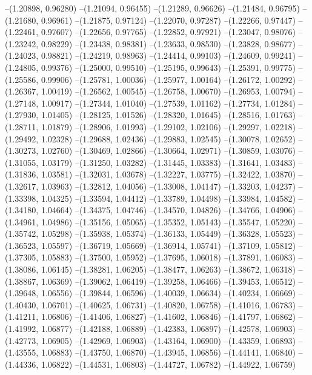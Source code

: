 --(1.20898, 0.96280)
--(1.21094, 0.96455)
--(1.21289, 0.96626)
--(1.21484, 0.96795)
--(1.21680, 0.96961)
--(1.21875, 0.97124)
--(1.22070, 0.97287)
--(1.22266, 0.97447)
--(1.22461, 0.97607)
--(1.22656, 0.97765)
--(1.22852, 0.97921)
--(1.23047, 0.98076)
--(1.23242, 0.98229)
--(1.23438, 0.98381)
--(1.23633, 0.98530)
--(1.23828, 0.98677)
--(1.24023, 0.98821)
--(1.24219, 0.98963)
--(1.24414, 0.99103)
--(1.24609, 0.99241)
--(1.24805, 0.99376)
--(1.25000, 0.99510)
--(1.25195, 0.99643)
--(1.25391, 0.99775)
--(1.25586, 0.99906)
--(1.25781, 1.00036)
--(1.25977, 1.00164)
--(1.26172, 1.00292)
--(1.26367, 1.00419)
--(1.26562, 1.00545)
--(1.26758, 1.00670)
--(1.26953, 1.00794)
--(1.27148, 1.00917)
--(1.27344, 1.01040)
--(1.27539, 1.01162)
--(1.27734, 1.01284)
--(1.27930, 1.01405)
--(1.28125, 1.01526)
--(1.28320, 1.01645)
--(1.28516, 1.01763)
--(1.28711, 1.01879)
--(1.28906, 1.01993)
--(1.29102, 1.02106)
--(1.29297, 1.02218)
--(1.29492, 1.02328)
--(1.29688, 1.02436)
--(1.29883, 1.02545)
--(1.30078, 1.02652)
--(1.30273, 1.02760)
--(1.30469, 1.02866)
--(1.30664, 1.02971)
--(1.30859, 1.03076)
--(1.31055, 1.03179)
--(1.31250, 1.03282)
--(1.31445, 1.03383)
--(1.31641, 1.03483)
--(1.31836, 1.03581)
--(1.32031, 1.03678)
--(1.32227, 1.03775)
--(1.32422, 1.03870)
--(1.32617, 1.03963)
--(1.32812, 1.04056)
--(1.33008, 1.04147)
--(1.33203, 1.04237)
--(1.33398, 1.04325)
--(1.33594, 1.04412)
--(1.33789, 1.04498)
--(1.33984, 1.04582)
--(1.34180, 1.04664)
--(1.34375, 1.04746)
--(1.34570, 1.04826)
--(1.34766, 1.04906)
--(1.34961, 1.04986)
--(1.35156, 1.05065)
--(1.35352, 1.05143)
--(1.35547, 1.05220)
--(1.35742, 1.05298)
--(1.35938, 1.05374)
--(1.36133, 1.05449)
--(1.36328, 1.05523)
--(1.36523, 1.05597)
--(1.36719, 1.05669)
--(1.36914, 1.05741)
--(1.37109, 1.05812)
--(1.37305, 1.05883)
--(1.37500, 1.05952)
--(1.37695, 1.06018)
--(1.37891, 1.06083)
--(1.38086, 1.06145)
--(1.38281, 1.06205)
--(1.38477, 1.06263)
--(1.38672, 1.06318)
--(1.38867, 1.06369)
--(1.39062, 1.06419)
--(1.39258, 1.06466)
--(1.39453, 1.06512)
--(1.39648, 1.06556)
--(1.39844, 1.06596)
--(1.40039, 1.06634)
--(1.40234, 1.06669)
--(1.40430, 1.06701)
--(1.40625, 1.06731)
--(1.40820, 1.06758)
--(1.41016, 1.06783)
--(1.41211, 1.06806)
--(1.41406, 1.06827)
--(1.41602, 1.06846)
--(1.41797, 1.06862)
--(1.41992, 1.06877)
--(1.42188, 1.06889)
--(1.42383, 1.06897)
--(1.42578, 1.06903)
--(1.42773, 1.06905)
--(1.42969, 1.06903)
--(1.43164, 1.06900)
--(1.43359, 1.06893)
--(1.43555, 1.06883)
--(1.43750, 1.06870)
--(1.43945, 1.06856)
--(1.44141, 1.06840)
--(1.44336, 1.06822)
--(1.44531, 1.06803)
--(1.44727, 1.06782)
--(1.44922, 1.06759)
